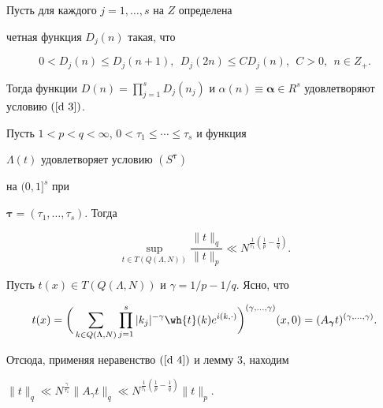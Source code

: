 \begin{note}


Пусть для каждого $j=1,\dotsc,s$ на $Z$ определена 


четная функция $D_j(n) $ такая, что


\begin{equation} \label{d 6}


0<D_j(n)\leq D_j(n+1),\ \ D_j(2n)\leq C D_j(n),\ \ C>0,\ \ n\in Z_+.


\end{equation}


Тогда функции $D(n)=\prod\limits_{j=1}^s D_j(n_j)$ и $\alpha(n)


\equiv {\boldsymbol{\alpha}}\in R^s$ удовлетворяют условию $(\ref{d 3})$.


\end{note}





\begin{thm} 


Пусть $1<p< q<\infty$, $0<\tau_1\leq\dotsb\leq{\tau_s}$ и функция 


$\Lambda(t)$ удовлетворяет условию $(S^{\boldsymbol{\tau}})$


на $(0,1]^s$ при 


${\boldsymbol{\tau}}=(\tau_1,\dotsc,\tau_s)$. Тогда


\begin{equation} \label{d 7}


\sup_{t\in T(Q(\Lambda,N))}\frac{\|t\|_q}{\|t


\|_p}\ll N^{\frac{1}{\tau_1} ({\frac{1}{p}}-{\frac{1}{q}})}.


\end{equation}


\end{thm}





\begin{pf}


Пусть $t(x)\in T(Q(\Lambda,N))$ и $\gamma=1/p-1/q$. Ясно, что


$$


t(x)=\bigg(\sum_{k\in Q(\Lambda,N)}\prod_{j=1}^s


|k_j|^{-\gamma} \wh{t}(k)e^{i(k,\cdot)}\bigg)^{(\gamma,\dotsc,


\gamma)} (x,0)=(A_{\boldsymbol{\gamma}} t )^{(\gamma,\dotsc,\gamma)}.


$$


Отсюда, применяя неравенство $(\ref{d 4})$ и лемму 3, находим 


$\|t\|_q \ll N^{\frac{\gamma}{\tau_1}}\|A_{\gamma}t\|_q


\ll N^{\frac{1}{\tau_1}(\frac{1}{p}-\frac{1}{q})} \|t\|_p$.


\end{pf}





